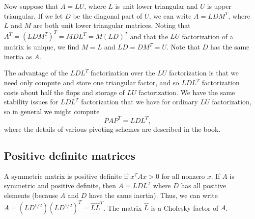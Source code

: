 \documentclass[12pt, leqno]{article} %
\begin{document}
Now suppose that $A = LU$, where $L$ is unit lower triangular and $U$
is upper triangular.  If we let $D$ be the diagonal part of $U$, we
can write $A = LDM^T$, where $L$ and $M$ are both unit lower triangular
matrices.  Noting that $A^T = (LDM^T)^T = M D L^T = M (LD)^T$ and
that the $LU$ factorization of a matrix is unique, we find $M = L$
and $LD = DM^T = U$.  Note that $D$ has the same inertia as $A$.

The advantage of the $LDL^T$ factorization over the $LU$ factorization
is that we need only compute and store one triangular factor, and so
$LDL^T$ factorization costs about half the flops and storage of $LU$
factorization.  We have the same stability issues for $LDL^T$
factorization that we have for ordinary $LU$ factorization, so in
general we might compute
\[
  P A P^T = LDL^T,
\]
where the details of various pivoting schemes are described in the book.

\subsection{Positive definite matrices}

A symmetric matrix is positive definite if $x^T A x > 0$ for all
nonzero $x$.  If $A$ is symmetric and positive definite, then $A =
LDL^T$ where $D$ has all positive elements (because $A$ and $D$ have
the same inertia).  Thus, we can write $A = (LD^{1/2})(LD^{1/2})^T =
\hat{L} \hat{L}^T$.  The matrix $\hat{L}$ is a Cholesky factor of $A$.
\end{document}
